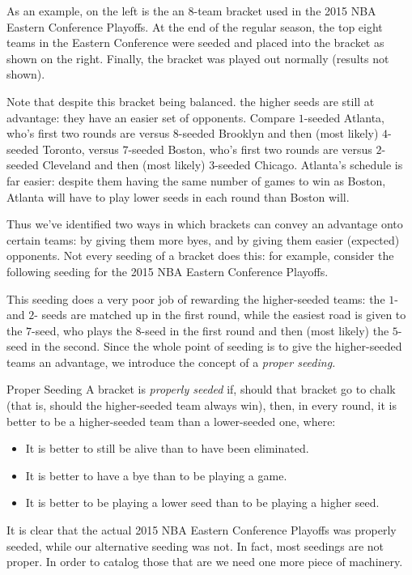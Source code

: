 \documentclass[../main.tex]{subfiles}
\begin{document}
As an example, on the left is the an $8$-team bracket used in the 2015 NBA Eastern Conference Playoffs. At the end of the regular season, the top eight teams in the Eastern Conference were seeded and placed into the bracket as shown on the right. Finally, the bracket was played out normally (results not shown).

Note that despite this bracket being balanced. the higher seeds are still at advantage: they have an easier set of opponents. Compare $1$-seeded Atlanta, who's first two rounds are versus $8$-seeded Brooklyn and then (most likely) $4$-seeded Toronto, versus $7$-seeded Boston, who's first two rounds are versus $2$-seeded Cleveland and then (most likely) $3$-seeded Chicago. Atlanta's schedule is far easier: despite them having the same number of games to win as Boston, Atlanta will have to play lower seeds in each round than Boston will.

Thus we've identified two ways in which brackets can convey an advantage onto certain teams: by giving them more byes, and by giving them easier (expected) opponents. Not every seeding of a bracket does this: for example, consider the following seeding for the 2015 NBA Eastern Conference Playoffs.


This seeding does a very poor job of rewarding the higher-seeded teams: the $1$- and $2$- seeds are matched up in the first round, while the easiest road is given to the $7$-seed, who plays the $8$-seed in the first round and then (most likely) the $5$-seed in the second. Since the whole point of seeding is to give the higher-seeded teams an advantage, we introduce the concept of a \textit{proper seeding.}

\begin{definition}{Proper Seeding}{}
    A bracket is \textit{properly seeded} if, should that bracket go to chalk (that is, should the higher-seeded team always win), then, in every round, it is better to be a higher-seeded team than a lower-seeded one, where: \begin{itemize}
        \item It is better to still be alive than to have been eliminated.
        \item It is better to have a bye than to be playing a game.
        \item It is better to be playing a lower seed than to be playing a higher seed.
    \end{itemize}
\end{definition}
It is clear that the actual 2015 NBA Eastern Conference Playoffs was properly seeded, while our alternative seeding was not. In fact, most seedings are not proper. In order to catalog those that are we need one more piece of machinery.
\end{document}
